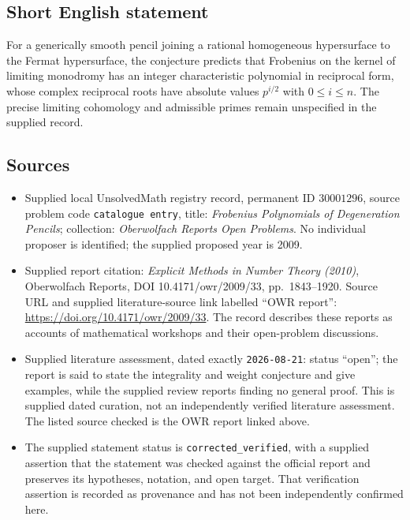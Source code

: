 \documentclass[11pt]{article}
\begin{document}
\subsection{Short English statement}
For a generically smooth pencil joining a rational homogeneous hypersurface to the Fermat hypersurface, the conjecture predicts that Frobenius on the kernel of limiting monodromy has an integer characteristic polynomial in reciprocal form, whose complex reciprocal roots have absolute values \(p^{i/2}\) with \(0\leq i\leq n\). The precise limiting cohomology and admissible primes remain unspecified in the supplied record.
\subsection{Sources}
\begin{itemize}
\item Supplied local UnsolvedMath registry record, permanent ID \(30001296\), source problem code \texttt{catalogue entry}, title: \emph{Frobenius Polynomials of Degeneration Pencils}; collection: \emph{Oberwolfach Reports Open Problems}. No individual proposer is identified; the supplied proposed year is 2009.
\item Supplied report citation: \emph{Explicit Methods in Number Theory (2010)}, Oberwolfach Reports, DOI 10.4171/owr/2009/33, pp.\ 1843--1920. Source URL and supplied literature-source link labelled ``OWR report'': \url{https://doi.org/10.4171/owr/2009/33}. The record describes these reports as accounts of mathematical workshops and their open-problem discussions.
\item Supplied literature assessment, dated exactly \texttt{2026-08-21}: status ``open''; the report is said to state the integrality and weight conjecture and give examples, while the supplied review reports finding no general proof. This is supplied dated curation, not an independently verified literature assessment. The listed source checked is the OWR report linked above.
\item The supplied statement status is \texttt{corrected\_verified}, with a supplied assertion that the statement was checked against the official report and preserves its hypotheses, notation, and open target. That verification assertion is recorded as provenance and has not been independently confirmed here.
\end{itemize}
\end{document}
